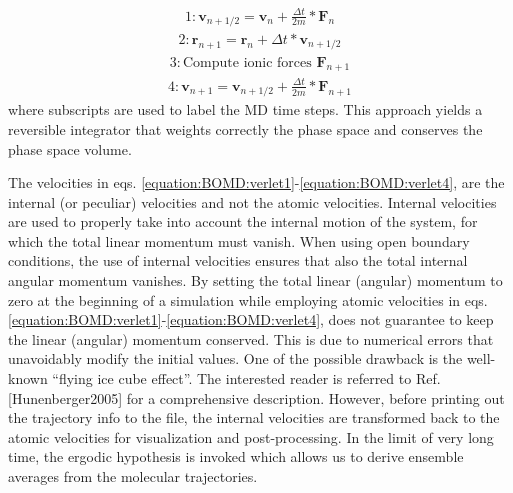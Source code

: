 \documentclass[letterpaper,10pt,english]{sphinxmanual}
\begin{document}
\label{\detokenize{BOMD:equation-verlet1}}\begin{equation}\label{equation:BOMD:verlet1}
\begin{split}1: \mathbf{v}_{n+1/2} = \mathbf{v}_n + \frac{\Delta t}{2m}*\mathbf{F}_n\end{split}
\end{equation}\label{\detokenize{BOMD:equation-verlet2}}\begin{equation}\label{equation:BOMD:verlet2}
\begin{split}2: \mathbf{r}_{n+1} = \mathbf{r}_n + \Delta t * \mathbf{v}_{n+1/2}\end{split}
\end{equation}\label{\detokenize{BOMD:equation-verlet3}}\begin{equation}\label{equation:BOMD:verlet3}
\begin{split}3: \mbox{Compute ionic forces } \mathbf{F}_{n+1}\end{split}
\end{equation}\label{\detokenize{BOMD:equation-verlet4}}\begin{equation}\label{equation:BOMD:verlet4}
\begin{split}4: \mathbf{v}_{n+1} = \mathbf{v}_{n+1/2} + \frac{\Delta t}{2m}*\mathbf{F}_{n+1}\end{split}
\end{equation}
where subscripts are used to label the MD time steps. This approach
yields a reversible integrator that weights correctly the phase space
and conserves the phase space volume.

The velocities in eqs. \eqref{equation:BOMD:verlet1}-\eqref{equation:BOMD:verlet4}, are the internal (or
peculiar) velocities and not the atomic velocities. Internal velocities
are used to properly take into account the internal motion of the
system, for which the total linear momentum must vanish. When using open
boundary conditions, the use of internal velocities ensures that also
the total internal angular momentum vanishes. By setting the total
linear (angular) momentum to zero at the beginning of a simulation while
employing atomic velocities in eqs. \eqref{equation:BOMD:verlet1}-\eqref{equation:BOMD:verlet4}, does not
guarantee to keep the linear (angular) momentum conserved. This is due
to numerical errors that unavoidably modify the initial values. One of
the possible drawback is the well-known “flying ice cube effect”. The
interested reader is referred to Ref. {[}Hunenberger2005{]}
for a comprehensive description. However, before printing out the
trajectory info to the  file, the internal velocities are
transformed back to the atomic velocities for visualization and
post-processing. In the limit of very long time, the ergodic hypothesis
is invoked which allows us to derive ensemble averages from the
molecular trajectories.
\end{document}

